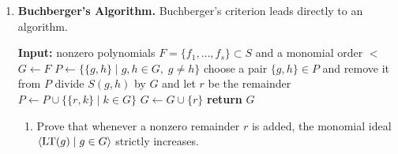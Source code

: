 \documentclass[Notebook.tex]{subfiles}
\begin{document}
\begin{enumerate}[leftmargin=*, resume=problems]
\begin{enumerate}[label=(\alph*),ref=\theenumi\alph*]
    \item For the converse, let $f\in I$ and write $f=q_1g_1+\cdots+q_tg_t$. For such a representation, define
    \[
    \delta(q_1,\ldots,q_t)=\max_i\LM(q_ig_i).
    \]
    Choose a representation of $f$ for which $\delta$ is as small as possible. Explain why this makes sense.
    
    \item Show that if the terms of monomial $\delta$ in the sum $\sum q_ig_i$ do not cancel, then $\LT(f)$ is divisible by some $\LT(g_i)$.
    
    \item Suppose instead that the terms of monomial $\delta$ cancel. Show that the cancellation gives a nontrivial relation among leading terms of some $g_i$'s.
    
    \item Use the assumption that every $S(g_i,g_j)$ reduces to zero to replace this relation by a combination of the $g_i$'s whose terms all have monomial strictly smaller than $\delta$.
    
    \item Explain why part (e) contradicts the minimal choice of the representation unless $\LT(f)$ is divisible by some $\LT(g_i)$.
    
    \item Conclude that $\init_<(I)=\langle \LT(g_1),\ldots,\LT(g_t)\rangle$.
\end{enumerate}

\item \textbf{Buchberger's Algorithm.} Buchberger's criterion leads directly to an algorithm.
\begin{algorithm}[H]
\caption{Buchberger's Algorithm}
\begin{algorithmic}[1]
\State \textbf{Input:} nonzero polynomials $F=\{f_1,\ldots,f_s\}\subset S$ and a monomial order $<$
\State $G\gets F$
\State $P\gets \{\{g,h\}\mid g,h\in G,\; g\neq h\}$
    \State choose a pair $\{g,h\}\in P$ and remove it from $P$
    \State divide $S(g,h)$ by $G$ and let $r$ be the remainder
        \State $P\gets P\cup \{\{r,k\}\mid k\in G\}$
        \State $G\gets G\cup\{r\}$
    \EndIf
\EndWhile
\State \textbf{return} $G$
\end{algorithmic}
\end{algorithm}

\begin{enumerate}[label=(\alph*),ref=\theenumi\alph*]
    \item Prove that whenever a nonzero remainder $r$ is added, the monomial ideal $\langle \text{LT}(g)\mid g\in G\rangle$ strictly increases.
    

\end{enumerate}
\end{enumerate}
\end{document}
